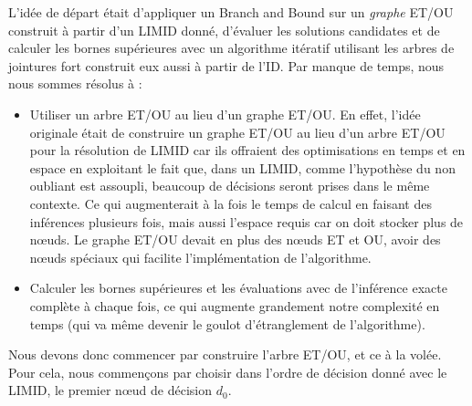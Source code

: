\documentclass[12pt]{article}
\begin{document}
L'idée de départ était d'appliquer un Branch and Bound sur un \textit{graphe} ET/OU construit à partir d'un LIMID donné, d'évaluer les solutions candidates et de calculer les bornes supérieures avec un algorithme itératif utilisant les arbres de jointures fort construit eux aussi à partir de l'ID. 
\bigbreak
Par manque de temps, nous nous sommes résolus à :
\begin{itemize}
    \item Utiliser un arbre ET/OU au lieu d'un graphe ET/OU. En effet, l'idée originale était de construire un graphe ET/OU au lieu d'un arbre ET/OU pour la résolution de LIMID car ils offraient des optimisations en temps et en espace en exploitant le fait que, dans un LIMID, comme l'hypothèse du non oubliant est assoupli, beaucoup de décisions seront prises dans le même contexte. Ce qui augmenterait à la fois le temps de calcul en faisant des inférences plusieurs fois, mais aussi l'espace requis car on doit stocker plus de nœuds. Le graphe ET/OU devait en plus des nœuds ET et OU, avoir des nœuds spéciaux qui facilite l'implémentation de l'algorithme.
    \item Calculer les bornes supérieures et les évaluations avec de l'inférence exacte complète à chaque fois, ce qui augmente grandement notre complexité en temps (qui va même devenir le goulot d'étranglement de l'algorithme).
\end{itemize}

Nous devons donc commencer par construire l'arbre ET/OU, et ce à la volée. Pour cela, nous commençons par choisir dans l'ordre de décision donné avec le LIMID, le premier nœud de décision $d_0$.
\end{document}
